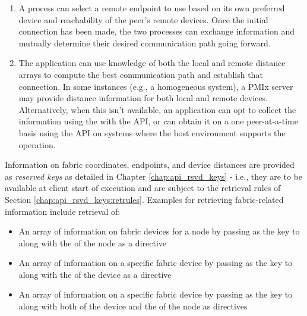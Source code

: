 \begin{enumerate}[label=\alph*)]
    \item A process can select a remote endpoint to use based on its own preferred device and reachability of the peer's remote devices. Once the initial connection has been made, the two processes can exchange information and mutually determine their desired communication path going forward.

    \item The application can use knowledge of both the local and remote distance arrays to compute the best communication path and establish that connection. In some instances (e.g., a homogeneous system), a \ac{PMIx} server may provide distance information for both local and remote devices. Alternatively, when this isn't available, an application can opt to collect the information using the  with the  \ac{API}, or can obtain it on a one peer-at-a-time basis using the  \ac{API} on systems where the host environment supports the  operation.

\end{enumerate}

Information on fabric coordinates, endpoints, and device distances are provided as \emph{reserved keys} as detailed in Chapter \ref{chap:api_rsvd_keys} - i.e., they are to be available at client start of execution and are subject to the retrieval rules of Section \ref{chap:api_rsvd_keys:retrules}. Examples for retrieving fabric-related information include retrieval of:

\begin{itemize}
    \item An array of information on fabric devices for a node by passing  as the key to  along with the  of the node as a directive

    \item An array of information on a specific fabric device by passing  as the key to  along with the  of the device as a directive

    \item An array of information on a specific fabric device by passing  as the key to  along with both  of the device and the  of the node as directives
\end{itemize}

